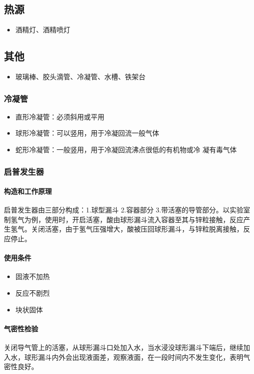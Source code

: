 \documentclass[a4paper]{article}
\begin{document}
	
	\subsection{热源}
	\begin{itemize}
		\item 酒精灯、酒精喷灯
	\end{itemize}
	
	
	\subsection{其他}
	\begin{itemize}
		\item 玻璃棒、胶头滴管、冷凝管、水槽、铁架台
	\end{itemize}
	
	\subsubsection{冷凝管}
	\begin{itemize}
		\item 直形冷凝管：必须斜用或平用
		\item 球形冷凝管：可以竖用，用于冷凝回流一般气体
		\item 蛇形冷凝管：一般竖用，用于冷凝回流沸点很低的有机物或冷 凝有毒气体
	\end{itemize}
	
	\subsubsection{启普发生器}
	\paragraph{构造和工作原理}
	启普发生器由三部分构成：1.球型漏斗 2.容器部分 3.带活塞的导管部分。以实验室制氢气为例，使用时，开启活塞，酸由球形漏斗流入容器至其与锌粒接触，反应产生氢气。关闭活塞，由于氢气压强增大，酸被压回球形漏斗，与锌粒脱离接触，反应停止。
	\paragraph{使用条件}
	\begin{itemize}
		\item 固液不加热
		\item 反应不剧烈
		\item 块状固体
	\end{itemize}
	\paragraph{气密性检验}
	关闭导气管上的活塞，从球形漏斗口处加入水，当水浸没球形漏斗下端后，继续加入水，球形漏斗内外会出现液面差，观察液面，在一段时间内不发生变化，表明气密性良好。
\end{document}
